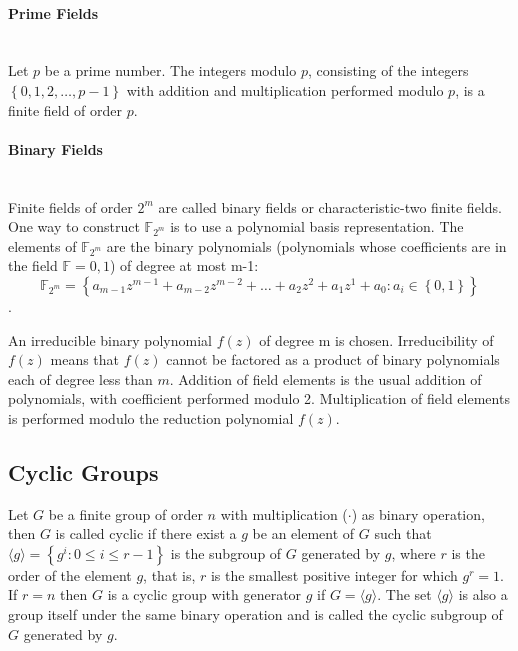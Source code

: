 \paragraph{Prime Fields}\mbox{}\\
Let $p$ be a prime number. The integers modulo $p$, consisting of the integers $\left\lbrace 0,1,2,\dots,p-1\right\rbrace $ with addition and multiplication performed modulo $p$, is a finite field of order $p$.
\paragraph{Binary Fields}\mbox{}\\
Finite fields of order $2^m$ are called binary fields or characteristic-two finite fields. One way to construct $\mathbb{F}_{2^m}$ is to use a polynomial basis representation. The elements of $\mathbb{F}_{2^m}$ are the binary polynomials (polynomials whose coefficients are in the field $\mathbb{F}={0,1}$) of degree at most m-1:
$$\mathbb{F}_{2^m}=\left\lbrace a_{m-1}z^{m-1}+a_{m-2}z^{m-2}+\dots+a_2z^2+a_1z^1+a_0 : a_i \in  \left\lbrace 0,1\right\rbrace \right\rbrace $$.

An irreducible binary polynomial $f(z)$ of degree m is chosen. Irreducibility of $f(z)$ means that $f(z)$ cannot be factored as a product of binary polynomials each of degree less than $m$. Addition of field elements is the usual addition of polynomials, with coefficient performed modulo 2. Multiplication of field elements is performed modulo the reduction polynomial $f(z)$. 
\subsection{Cyclic Groups}
Let $G$ be a finite group of order $n$ with multiplication ($\cdot$) as binary operation, then $G$ is called cyclic if there exist a $g$ be an element of $G$ such that $\langle g \rangle = \left\lbrace g^i : 0 \leq i \leq r-1 \right\rbrace $ is the subgroup of $G$ generated by $g$, where $r$ is the order of the element $g$, that is, $r$ is the smallest positive integer for which $g^r = 1$. If $r=n$ then $G$ is a cyclic group with generator $g$ if $G = \langle g \rangle$. The set $\langle
 g \rangle$ is also a group itself under the same binary operation and is called the cyclic subgroup of $G$ generated by $g$.
 

